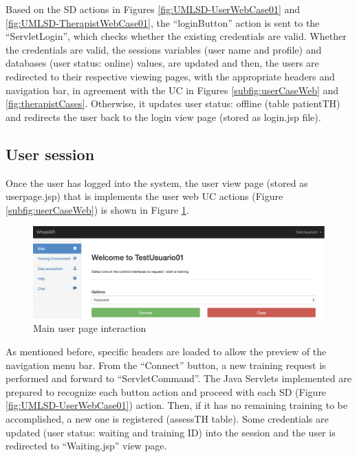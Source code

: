 Based on the SD actions in Figures \ref{fig:UMLSD-UserWebCase01} and \ref{fig:UMLSD-TherapistWebCase01}, the ``loginButton'' action is sent to the ``ServletLogin'', which checks whether the existing credentials are valid. Whether the credentials are valid, the sessions variables (user name and profile) and databases (user status: online) values, are updated and then, the users are redirected to their respective viewing pages, with the appropriate headers and navigation bar, in agreement with the UC in Figures \ref{subfig:userCaseWeb} and \ref{fig:therapistCases}. Otherwise, it updates user status: offline (table patientTH) and redirects the user back to the login view page (stored as login.jsp file). 

\subsection{User session}

Once the user has logged into the system, the user view page (stored as userpage.jsp) that is implements the user web UC actions (Figure \ref{subfig:userCaseWeb}) is shown in Figure \ref{fig:tUserSession}.

\begin{figure}[!hbt]
\begin{center}
\includegraphics[width=0.95\linewidth]{img/cap5/tUserSession}
\caption{Main user page interaction} \label{fig:tUserSession}
\end{center}
\vspace{-15pt}
\end{figure}

As mentioned before, specific headers are loaded to allow the preview of the navigation menu bar. From the ``Connect'' button, a new training request is performed and forward to ``ServletCommand''. The Java Servlets implemented are prepared to recognize each button action and proceed with each SD (Figure \ref{fig:UMLSD-UserWebCase01}) action. Then,  if it has no remaining training to be accomplished, a new one is registered (assessTH table). Some credentials are updated (user status: waiting and training ID) into the session and the user is redirected to ``Waiting.jsp'' view page. 


